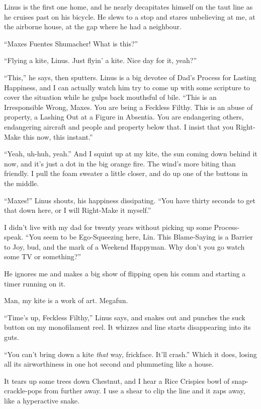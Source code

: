 Linus is the first one home, and he nearly decapitates himself on
the taut line as he cruises past on his bicycle. He slews to a stop
and stares unbelieving at me, at the airborne house, at the gap
where he had a neighbour.

``Maxes Fuentes Shumacher! What is this?''

``Flying a kite, Linus. Just flyin' a kite. Nice day for it, yeah?''

``This,'' he says, then sputters. Linus is a big devotee of Dad's
Process for Lasting Happiness, and I can actually watch him try to
come up with some scripture to cover the situation while he gulps
back mouthsful of bile.
``This is an Irresponsible Wrong, Maxes. You are being a Feckless Filthy. This 
is an abuse of property, a Lashing Out at a Figure in Absentia. You are 
endangering others, endangering aircraft and people and property below that. I 
insist that you Right-Make this now, this instant.''

``Yeah, uh-huh, yeah.'' And I squint up at my kite, the sun coming
down behind it now, and it's just a dot in the big orange fire. The
wind's more biting than friendly. I pull the foam sweater a little
closer, and do up one of the buttons in the middle.

``Maxes!'' Linus shouts, his happiness dissipating.
``You have thirty seconds to get that down here, or I will Right-Make it 
myself.''

I didn't live with my dad for twenty years without picking up some
Process-speak.
``You seem to be Ego-Squeezing here, Lin. This Blame-Saying is a Barrier to 
Joy, bud, and the mark of a Weekend Happyman. Why don't you go watch some TV or 
something?''

He ignores me and makes a big show of flipping open his comm and
starting a timer running on it.

Man, my kite is a work of art. Megafun.

``Time's up, Feckless Filthy,'' Linus says, and snakes out and
punches the suck button on my monofilament reel. It whizzes and
line starts disappearing into its guts.

``You can't bring down a kite \emph{that} way, frickface. It'll crash.''
Which it does, losing all its airworthiness in one hot second and
plummeting like a house.

It tears up some trees down Chestnut, and I hear a Rice Crispies
bowl of snap-crackle-pops from further away. I use a shear to clip
the line and it zaps away, like a hyperactive snake.

